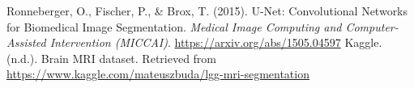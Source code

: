 \documentclass[11pt,a4paper]{article}
\begin{document}
\begin{thebibliography}{9}
Ronneberger, O., Fischer, P., \& Brox, T. (2015). U-Net: Convolutional Networks for Biomedical Image Segmentation. \textit{Medical Image Computing and Computer-Assisted Intervention (MICCAI)}. \url{https://arxiv.org/abs/1505.04597}
Kaggle. (n.d.). Brain MRI dataset. Retrieved from \url{https://www.kaggle.com/mateuszbuda/lgg-mri-segmentation}
\end{thebibliography}
\end{document}
